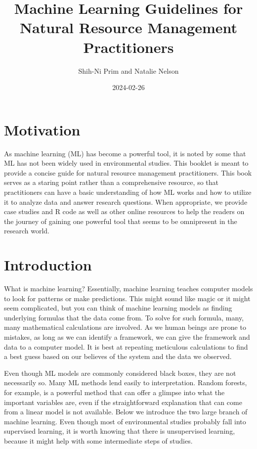 \documentclass[
]{book}
\title{Machine Learning Guidelines for Natural Resource Management Practitioners}
\author{Shih-Ni Prim and Natalie Nelson}
\date{2024-02-26}
\begin{document}
\maketitle

{
\setcounter{tocdepth}{1}
\tableofcontents
}
\hypertarget{motivation}{%
\chapter{Motivation}\label{motivation}}

As machine learning (ML) has become a powerful tool, it is noted by some that ML has not been widely used in environmental studies. This booklet is meant to provide a concise guide for natural resource management practitioners. This book serves as a staring point rather than a comprehensive resource, so that practitioners can have a basic understanding of how ML works and how to utilize it to analyze data and answer research questions. When appropriate, we provide case studies and R code as well as other online resources to help the readers on the journey of gaining one powerful tool that seems to be omnipresent in the research world.

\hypertarget{intro}{%
\chapter{Introduction}\label{intro}}

What is machine learning? Essentially, machine learning teaches computer models to look for patterns or make predictions. This might sound like magic or it might seem complicated, but you can think of machine learning models as finding underlying formulas that the data come from. To solve for such formula, many, many mathematical calculations are involved. As we human beings are prone to mistakes, as long as we can identify a framework, we can give the framework and data to a computer model. It is best at repeating meticulous calculations to find a best guess based on our believes of the system and the data we observed.

Even though ML models are commonly considered black boxes, they are not necessarily so. Many ML methods lend easily to interpretation. Random forests, for example, is a powerful method that can offer a glimpse into what the important variables are, even if the straightforward explanation that can come from a linear model is not available. Below we introduce the two large branch of machine learning. Even though most of environmental studies probably fall into supervised learning, it is worth knowing that there is unsupervised learning, because it might help with some intermediate steps of studies.
\end{document}
